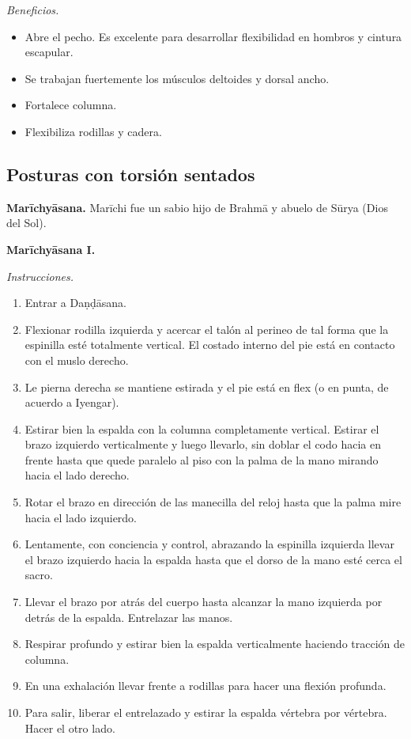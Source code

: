 \emph{Beneficios.}
\begin{itemize}
\item Abre el pecho. Es excelente para
desarrollar flexibilidad en hombros y cintura
escapular.
\item Se trabajan fuertemente los músculos
deltoides y dorsal ancho.
\item Fortalece columna.
\item Flexibiliza rodillas y cadera.
\end{itemize}

\subsection{Posturas con torsión sentados}
\label{section-posturas-con-torsion-sentados}

\medskip\noindent\textbf{Marīchyāsana.}
Marīchi fue un sabio hijo de Brahmā y abuelo
de Sūrya (Dios del Sol).

\medskip\noindent\textbf{Marīchyāsana I.}

\emph{Instrucciones.}
\begin{enumerate}
\item Entrar a Daṇḍāsana.
\item Flexionar rodilla izquierda y acercar
el talón al perineo de tal forma que la
espinilla esté totalmente vertical. El
costado interno del pie está en contacto con
el muslo derecho.
\item Le pierna derecha se mantiene estirada
y el pie está en flex (o en punta, de acuerdo
a Iyengar).
\item Estirar bien la espalda con la columna
completamente vertical. Estirar el brazo
izquierdo verticalmente y luego llevarlo, sin
doblar el codo hacia en frente hasta que
quede paralelo al piso con la palma de la
mano mirando hacia el lado derecho.
\item Rotar el brazo en dirección de las
manecilla del reloj hasta que la palma mire
hacia el lado izquierdo.
\item Lentamente, con conciencia y control,
abrazando la espinilla izquierda llevar el
brazo izquierdo hacia la espalda hasta que el
dorso de la mano esté cerca el sacro.
\item Llevar el brazo por atrás del cuerpo
hasta alcanzar la mano izquierda por detrás
de la espalda. Entrelazar las manos.
\item Respirar profundo y estirar bien la
espalda verticalmente haciendo tracción de
columna.
\item En una exhalación llevar frente a
rodillas para hacer una flexión profunda.
\item Para salir, liberar el entrelazado y
estirar la espalda vértebra por vértebra.
Hacer el otro lado.
\end{enumerate}

